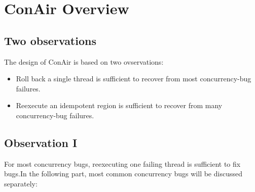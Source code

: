 \section{ConAir Overview}
\label{chp:Overview}
\subsection {Two observations}
The design of ConAir is based on two ovservations:
\begin{itemize}
\item
Roll back a single thread is sufficient to recover from most concurrency-bug failures.
\item
Reexecute an idempotent region is sufficient to recover from many concurrency-bug failures.
\end{itemize}
\subsection{Observation I}
For most concurrency bugs, reexecuting one failing thread is sufficient to fix bugs.In the following part, most common concurrency bugs will be discussed separately:\\
